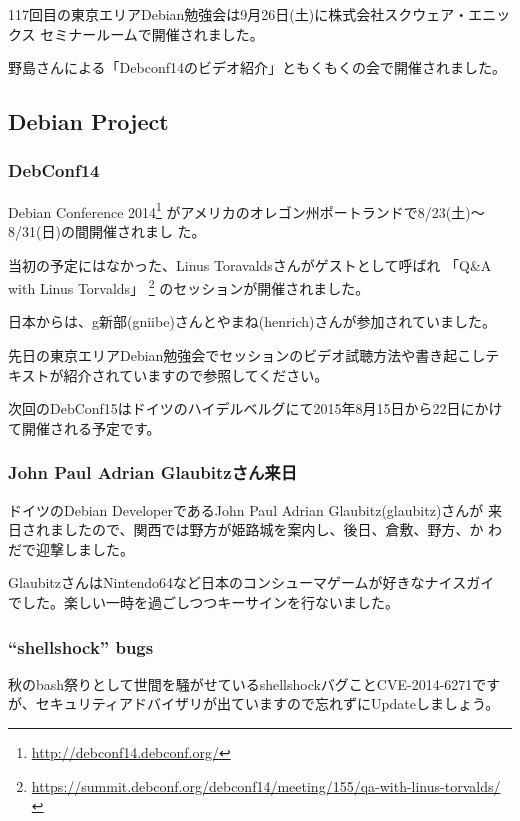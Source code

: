 \documentclass[mingoth,a4paper]{jsarticle}
\begin{document}
117回目の東京エリアDebian勉強会は9月26日(土)に株式会社スクウェア・エニッ
クス セミナールームで開催されました。

野島さんによる「Debconf14のビデオ紹介」ともくもくの会で開催されました。

\subsection{Debian Project}

\subsubsection{DebConf14}

Debian Conference 2014\footnote{\url{http://debconf14.debconf.org/}}
がアメリカのオレゴン州ポートランドで8/23(土)〜8/31(日)の間開催されまし
た。

当初の予定にはなかった、Linus Toravaldsさんがゲストとして呼ばれ
「Q\&A with Linus Torvalds」
\footnote{\url{https://summit.debconf.org/debconf14/meeting/155/qa-with-linus-torvalds/}}
のセッションが開催されました。

日本からは、g新部(gniibe)さんとやまね(henrich)さんが参加されていました。

先日の東京エリアDebian勉強会でセッションのビデオ試聴方法や書き起こしテ
キストが紹介されていますので参照してください。

次回のDebConf15はドイツのハイデルベルグにて2015年8月15日から22日にかけ
て開催される予定です。


\subsubsection{John Paul Adrian Glaubitzさん来日}

ドイツのDebian DeveloperであるJohn Paul Adrian Glaubitz(glaubitz)さんが
来日されましたので、関西では野方が姫路城を案内し、後日、倉敷、野方、か
わだで迎撃しました。

GlaubitzさんはNintendo64など日本のコンシューマゲームが好きなナイスガイ
でした。楽しい一時を過ごしつつキーサインを行ないました。


\subsubsection{``shellshock'' bugs}

秋のbash祭りとして世間を騒がせているshellshockバグことCVE-2014-6271です
が、セキュリティアドバイザリが出ていますので忘れずにUpdateしましょう。
\end{document}
